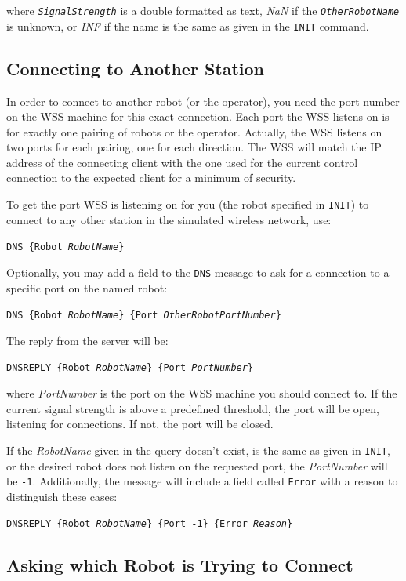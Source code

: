 \documentclass[11pt,a4paper]{article}
\begin{document}
where \texttt{\textit{SignalStrength}} is a double formatted as text, \textit{NaN} if the \texttt{\textit{OtherRobotName}} is unknown, or \textit{INF} if the name is the same as given in the \texttt{INIT} command.

\subsection{Connecting to Another Station}
\label{sec:DNS}

In order to connect to another robot (or the operator), you need the port number on the WSS machine for this exact connection. Each port the WSS listens on is for exactly one pairing of robots or the operator. Actually, the WSS listens on two ports for each pairing, one for each direction. The WSS will match the IP address of the connecting client with the one used for the current control connection to the expected client for a minimum of security.

To get the port WSS is listening on for you (the robot specified in \texttt{INIT}) to connect to any other station in the simulated wireless network, use:

\texttt{DNS \{Robot \textit{RobotName}\}}

Optionally, you may add a field to the \texttt{DNS} message to ask for a connection to a specific port on the named robot:

\texttt{DNS \{Robot \textit{RobotName}\} \{Port \textit{OtherRobotPortNumber}\}}

The reply from the server will be:

\texttt{DNSREPLY \{Robot \textit{RobotName}\} \{Port \textit{PortNumber}\}}

where \textit{PortNumber} is the port on the WSS machine you should connect to. If the current signal strength is above a predefined threshold, the port will be open, listening for connections. If not, the port will be closed.

If the \textit{RobotName} given in the query doesn't exist, is the same as given in \texttt{INIT}, or the desired robot does not listen on the requested port, the \textit{PortNumber} will be \texttt{-1}. Additionally, the message will include a field called \texttt{Error} with a reason to distinguish these cases:

\texttt{DNSREPLY \{Robot \textit{RobotName}\} \{Port -1\} \{Error \textit{Reason}\}}

\subsection{Asking which Robot is Trying to Connect}
\end{document}
